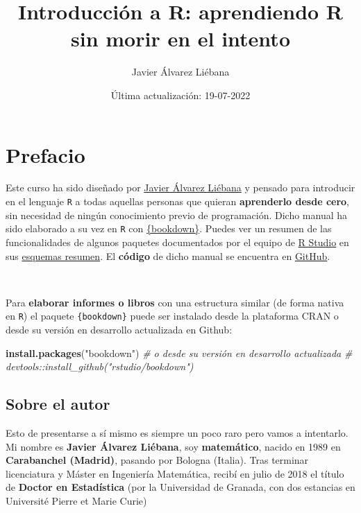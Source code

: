\documentclass[11pt,]{book}
\title{Introducción a R: aprendiendo R sin morir en el intento}
\author{Javier Álvarez Liébana}
\date{Última actualización: 19-07-2022}
\newenvironment{Shaded}{\begin{snugshade}}{\end{snugshade}}
\newcommand{\CommentTok}[1]{\textcolor[rgb]{0.37,0.37,0.37}{\textit{#1}}}
\newcommand{\KeywordTok}[1]{\textcolor[rgb]{0.27,0.27,0.27}{\textbf{#1}}}
\newcommand{\NormalTok}[1]{#1}
\newcommand{\StringTok}[1]{\textcolor[rgb]{0.5,0.5,0.5}{#1}}
\begin{document}
\maketitle

{
\hypersetup{linkcolor=}
\setcounter{tocdepth}{4}
\tableofcontents
}
\listoftables
\listoffigures
\hypertarget{prefacio}{%
\chapter*{Prefacio}\label{prefacio}}


Este curso ha sido diseñado por \href{https://dadosdelaplace.github.io}{Javier Álvarez Liébana} y pensado para introducir en el lenguaje \texttt{R} a todas aquellas personas que quieran \textbf{aprenderlo desde cero}, sin necesidad de ningún conocimiento previo de programación. Dicho manual ha sido elaborado a su vez en \texttt{R} con \href{https://github.com/rstudio/bookdown}{\{bookdown\}}. Puedes ver un resumen de las funcionalidades de algunos paquetes documentados por el equipo de \href{https://www.rstudio.com/}{R Studio} en sus \href{https://www.rstudio.com/resources/cheatsheets/}{esquemas resumen}. El \textbf{código} de dicho manual se encuentra en \href{https://github.com/dadosdelaplace/intro-R}{GitHub}.

~

Para \textbf{elaborar informes o libros} con una estructura similar (de forma nativa en \texttt{R}) el paquete \texttt{\{bookdown\}} puede ser instalado desde la plataforma CRAN o desde su versión en desarrollo actualizada en Github:

\begin{Shaded}
\begin{Highlighting}[]
\KeywordTok{install.packages}\NormalTok{(}\StringTok{"bookdown"}\NormalTok{)}
\CommentTok{# o desde su versión en desarrollo actualizada}
\CommentTok{# devtools::install_github("rstudio/bookdown")}
\end{Highlighting}
\end{Shaded}

\hypertarget{sobre-el-autor}{%
\section*{Sobre el autor}\label{sobre-el-autor}}


Esto de presentarse a sí mismo es siempre un poco raro pero vamos a intentarlo. Mi nombre es \textbf{Javier Álvarez Liébana}, soy \textbf{matemático}, nacido en 1989 en \textbf{Carabanchel (Madrid)}, pasando por Bologna (Italia). Tras terminar licenciatura y Máster en Ingeniería Matemática, recibí en julio de 2018 el título de \textbf{Doctor en Estadística} (por la Universidad de Granada, con dos estancias en Université Pierre et Marie Curie)
\end{document}
